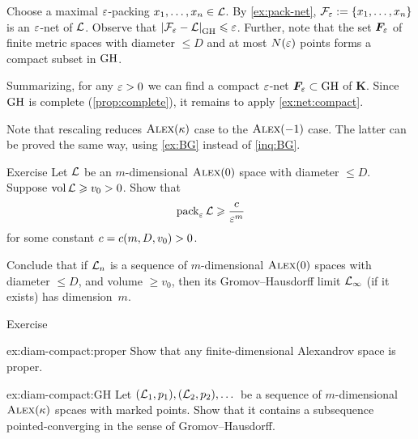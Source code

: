Choose a maximal $\varepsilon$-packing $x_1,\z\dots,x_n\in \spc{L}$.
By \ref{ex:pack-net}, $\spc{F}_\eps\z\df\{x_1,\z\dots,x_n\}$ is an $\varepsilon$-net of $\mathcal{L}$.
Observe that $\dist{\spc{F}_\eps}{\spc{L}}{\GH}\le \eps$.
Further, note that the set $\bm{F}_\varepsilon$ of finite metric spaces with diameter $\le D$ and at most $N(\varepsilon)$ points forms a compact subset in $\operatorname{\rm GH}\nolimits$.

Summarizing, for any $\varepsilon>0$ we can find a compact $\varepsilon$-net $\bm{F}_\varepsilon\subset \operatorname{\rm GH}\nolimits$ of $\bm{K}$.
Since $\operatorname{\rm GH}\nolimits$ is complete (\ref{prop:complete}), it remains to apply \ref{ex:net:compact}.

Note that rescaling reduces $\textsc{Alex}(\kappa)$ case to the $\textsc{Alex}(-1)$ case.
The latter can be proved the same way, using \ref{ex:BG} instead of \ref{inq:BG}.
\qeds

\begin{thm}{Exercise}\label{ex:pack-vol}
Let $\mathcal{L}$ be an $m$-dimensional $\textsc{Alex}(0)$ space with diameter $\le D$.
Suppose $\operatorname{\rm vol}\nolimits\mathcal{L}\geqslant v_0>0$.
Show that 
\[\operatorname{\rm pack}\nolimits_\varepsilon\mathcal{L}\geqslant \frac{c}{\varepsilon^m}\]
for some constant $c=c(m,D,v_0)>0$.

Conclude that if $\mathcal{L}_n$ is a sequence of $m$-dimensional $\textsc{Alex}(0)$ spaces with diameter $\le D$, and volume $\ge v_0$, then its Gromov--Hausdorff limit $\mathcal{L}_\infty$ (if it exists) has dimension~$m$.%
\end{thm}

\begin{thm}{Exercise}\label{ex:diam-compact}

\begin{subthm}{ex:diam-compact:proper}
Show that any finite-dimensional Alexandrov space is proper.
\end{subthm}

\begin{subthm}{ex:diam-compact:GH}
Let $(\mathcal{L}_1,p_1),(\mathcal{L}_2,p_2),\dots$ be a sequence of $m$-dimensional $\textsc{Alex}(\kappa)$ spcaes with marked points.
Show that it contains a subsequence pointed-converging in the sense of Gromov--Hausdorff.
\end{subthm}

\end{thm}

